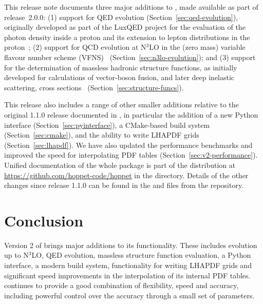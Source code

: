\documentclass[preprint,1p,a4paper,11pt]{elsarticle}
\begin{document}
This release note documents three major additions to \hoppet, made
available as part of release~2.0.0: (1) support for QED evolution (Section~\ref{sec:qed-evolution}),
originally developed as part of the LuxQED project for the evaluation
of the photon density inside a proton and its extension to lepton
distributions in the
proton~\cite{Manohar:2016nzj,Manohar:2017eqh,Buonocore:2020nai,Buonocore:2021bsf};
%
(2) support for QCD evolution at N$^3$LO in the (zero mass) variable
flavour number scheme (VFNS)~\cite{Buza:1996wv} (Section~\ref{sec:n3lo-evolution});
%
and (3) support for the
determination of massless hadronic structure functions, as initially developed
for calculations of vector-boson fusion, and later deep inelastic scattering, cross
sections~\cite{Cacciari:2015jma,Dreyer:2016oyx,Dreyer:2018qbw,Dreyer:2018rfu,Karlberg:2024hnl}
(Section~\ref{sec:structure-funcs}).

This release also includes a range of other smaller additions relative
to the original 1.1.0 release documented in \cite{Salam:2008qg}, in
particular the addition of a new Python interface
(Section~\ref{sec:pyinterface}), a CMake-based build system
(Section~\ref{sec:cmake}), and the ability to write LHAPDF grids
(Section~\ref{sec:lhapdf}).
%
We have also updated the performance benchmarks and improved the speed
for interpolating PDF tables (Section~\ref{sec:v2-performance}).
%
Unified documentation of the whole \hoppet package is part of the
distribution at \url{https://github.com/hoppet-code/hoppet} in the
 directory.
%
Details of the other changes since release 1.1.0 can be found in the
 and  files from the
repository.\medskip

\noindent {}



\section{Conclusion}

Version 2 of \hoppet brings major additions to its functionality.
%
These includes evolution up to N$^3$LO, QED evolution, massless
structure function evaluation, a Python interface, a modern build
system, functionality for writing LHAPDF grids and significant speed
improvements in the interpolation of its internal PDF tables.
%
\hoppet continues to provide a good combination of flexibility, speed
and accuracy, including powerful control over the accuracy through a
small set of parameters.
%
\end{document}

